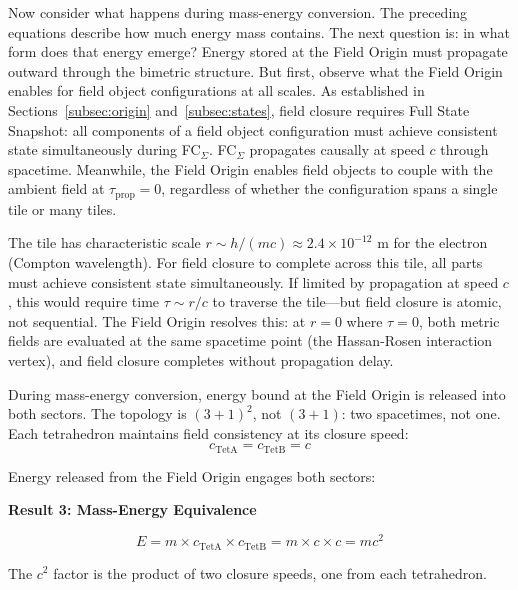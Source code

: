 \documentclass[aps,prd,preprint,superscriptaddress,showpacs,preprintnumbers,amsmath,amssymb,nofootinbib]{revtex4-2}
\begin{document}
Now consider what happens during mass-energy conversion. The preceding equations describe how much energy mass contains. The next question is: in what form does that energy emerge? Energy stored at the Field Origin must propagate outward through the bimetric structure. But first, observe what the Field Origin enables for field object configurations at all scales. As established in Sections~\ref{subsec:origin} and~\ref{subsec:states}, field closure requires Full State Snapshot: all components of a field object configuration must achieve consistent state simultaneously during FC$_{\Sigma}$. FC$_{\Sigma}$ propagates causally at speed $c$ through spacetime. Meanwhile, the Field Origin enables field objects to couple with the ambient field at $\tau_{\text{prop}} = 0$, regardless of whether the configuration spans a single tile or many tiles.

The tile has characteristic scale $r \sim h/(mc) \approx 2.4 \times 10^{-12}$ m for the electron (Compton wavelength). For field closure to complete across this tile, all parts must achieve consistent state simultaneously. If limited by propagation at speed $c$, this would require time $\tau \sim r/c$ to traverse the tile---but field closure is atomic, not sequential. The Field Origin resolves this: at $r = 0$ where $\tau = 0$, both metric fields are evaluated at the same spacetime point (the Hassan-Rosen interaction vertex), and field closure completes without propagation delay.

During mass-energy conversion, energy bound at the Field Origin is released into both sectors. The topology is $(3{+}1)^2$, not $(3{+}1)$: two spacetimes, not one. Each tetrahedron maintains field consistency at its closure speed:
\begin{equation}
c_{\text{TetA}} = c_{\text{TetB}} = c
\end{equation}

Energy released from the Field Origin engages both sectors:

\vspace{1.5em}
\noindent
\colorbox{resultgreen}{\parbox{\dimexpr\textwidth-2\fboxsep\relax}{%
\vspace{0.8em}
\centering
\textbf{\large Result 3: Mass-Energy Equivalence}

\vspace{0.5em}
\boldmath
\begin{equation}
E = m \times c_{\text{TetA}} \times c_{\text{TetB}} = m \times c \times c = mc^2
\end{equation}
\unboldmath

\vspace{0.3em}
The $c^2$ factor is the product of two closure speeds, one from each tetrahedron.
\vspace{0.5em}
}}
\vspace{1cm}
\end{document}
